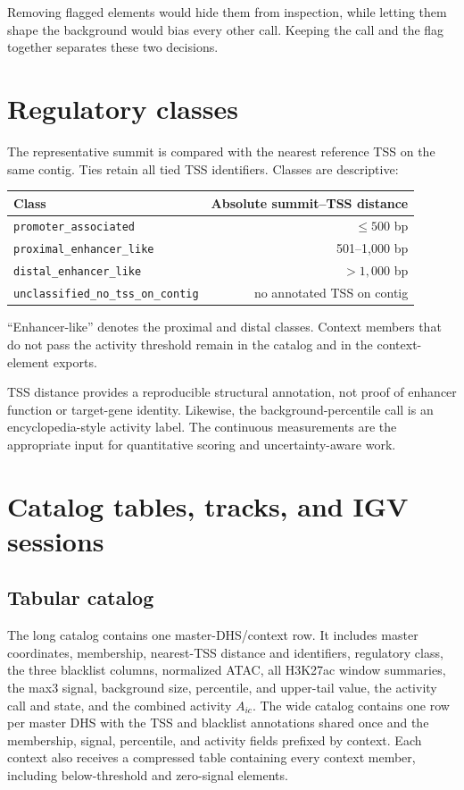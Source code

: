 \documentclass[11pt]{article}
\begin{document}
Removing flagged elements would hide them from inspection, while letting them
shape the background would bias every other call.  Keeping the call and the
flag together separates these two decisions.

\section{Regulatory classes}

The representative summit is compared with the nearest reference TSS on the
same contig.  Ties retain all tied TSS identifiers.  Classes are descriptive:

\begin{center}
\begin{tabular}{lr}
\toprule
Class & Absolute summit--TSS distance \\
\midrule
\texttt{promoter\_associated} & \(\leq500\) bp \\
\texttt{proximal\_enhancer\_like} & 501--1,000 bp \\
\texttt{distal\_enhancer\_like} & \(>1{,}000\) bp \\
\texttt{unclassified\_no\_tss\_on\_contig} & no annotated TSS on contig \\
\bottomrule
\end{tabular}
\end{center}

``Enhancer-like'' denotes the proximal and distal classes.  Context members
that do not pass the activity threshold remain in the catalog and in the
context-element exports.

TSS distance provides a reproducible structural annotation, not proof of
enhancer function or target-gene identity.  Likewise, the background-percentile
call is an encyclopedia-style activity label.  The continuous measurements are
the appropriate input for quantitative scoring and uncertainty-aware work.

\section{Catalog tables, tracks, and IGV sessions}

\subsection{Tabular catalog}

The long catalog contains one master-DHS/context row.  It includes master
coordinates, membership, nearest-TSS distance and identifiers, regulatory
class, the three blacklist columns, normalized ATAC, all H3K27ac window
summaries, the max3 signal, background size, percentile, and upper-tail value,
the activity call and state, and the combined activity \(A_{ic}\).  The wide
catalog contains one row per master DHS with the TSS and blacklist annotations
shared once and the membership, signal, percentile, and activity fields
prefixed by context.  Each context also receives a compressed table
containing every context member, including below-threshold and zero-signal
elements.
\end{document}
